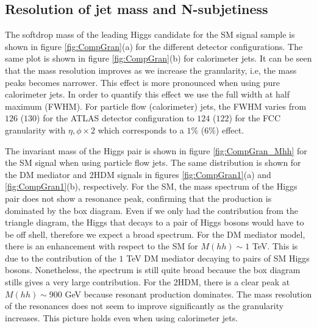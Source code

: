 \subsection{Resolution of jet mass and N-subjetiness}
\label{sec:res}

The softdrop mass of the leading Higgs candidate for the SM signal sample is shown in figure \ref{fig:CompGran}(a) for the different detector configurations. The same plot is shown in figure \ref{fig:CompGran}(b) for calorimeter jets. It can be seen that the mass resolution improves as we increase the granularity, i.e, the mass peaks becomes narrower. This effect is more pronounced when using pure calorimeter jets. In order to quantify this effect we use the full width at half maximum (FWHM). For particle flow (calorimeter) jets, the FWHM varies from $126$ ($130$) for the ATLAS detector configuration to $124$ ($122$) for the FCC granularity with $\eta,\phi\times 2$ which corresponds to a $1\%$ ($6\%$) effect.

The invariant mass of the Higgs pair is shown in figure \ref{fig:CompGran_Mhh} for the SM signal when using particle flow jets. The same distribution is shown for the DM mediator and 2HDM signals in figures \ref{fig:CompGran1}(a) and \ref{fig:CompGran1}(b), respectively. For the SM, the mass spectrum of the Higgs pair does not show a resonance peak, confirming that the production is dominated by the box diagram. Even if we only had the contribution from the triangle diagram, the Higgs that decays to a pair of Higgs bosons would have to be off shell, therefore we expect a broad spectrum. For the DM mediator model, there is an enhancement with respect to the SM for $M(hh)\sim 1$ TeV. This is due to the contribution of the $1$ TeV DM mediator decaying to pairs of SM Higgs bosons. Nonetheless, the spectrum is still quite broad because the box diagram stills gives a very large contribution. For the 2HDM, there is a clear peak at $M(hh)\sim 900$ GeV because resonant production dominates. The mass resolution of the resonances does not seem to improve significantly as the granularity increases. This picture holds even when using calorimeter jets.

